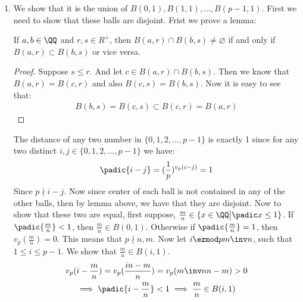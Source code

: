 \begin{enumerate}[label=\ilabel]
        \begin{gather*}
            x = p^r w = p^k p^{r - k} w
        \end{gather*}
        And since $p^{r - k} w \in \ZZ_p$, then $x \in p^k \ZZ_p$. This follows that $I \subseteq p^k \ZZ_p$. Hence $I = p^k \ZZ_p$. And we know that $p^k \ZZ_p$ is describing $B(0, (\frac{1}{p})^k) = \{ x \in \ZZ_p \big| \padic x < (\frac{1}{p})^k \}$. Hence the proof is complete.
    \item
        We show that it is the union of $B(0, 1), B(1, 1), \dots, B(p - 1, 1)$. First we need to show that these balls are disjoint. Frist we prove a lemma:
        \begin{lemma}
            If $a, b \in \QQ$ and $r, s \in R^+$, then $B(a, r) \cap B(b, s) \ne \varnothing$ if and only if $B(a, r) \subset B(b, s)$ or vice versa.
        \end{lemma}
        \begin{proof}
            Suppose $s \le r$. And let $c \in B(a, r) \cap B(b, s)$. Then we know that $B(a, r) = B(c, r)$ and also $B(c, s) = B(b, s)$. Now it is easy to see that:
            \begin{gather*}
                B(b, s) = B(c, s) \subset B(c, r) = B(a, r)
            \end{gather*}
        \end{proof}
        The distance of any two number in $\{0, 1, 2, \dots, p - 1\}$ is exactly 1 since for any two distinct $i, j \in \{0, 1, 2, \dots, p - 1 \}$ we have:
        \begin{gather*}
            \padic{i - j} = (\frac{1}{p})^{v_p(i - j)} = 1
        \end{gather*}
        Since $p \nmid i - j$. Now since center of each ball is not contained in any of the other balls, then by lemma above, we have that they are disjoint. Now to show that these two are equal, first suppose, $\frac{m}{n} \in \{ x \in \QQ \big| \padic x \le 1 \}$.
        If $\padic{\frac{m}{n}} < 1$, then $\frac{m}{n} \in B(0, 1)$. Otherwise if $\padic{\frac{m}{n}} = 1$, then $v_p(\frac{m}{n}) = 0$. This means that $p \nmid n, m$. Now let $i \ezmod p m \inv n$, such that $1 \le i \le p - 1$. We show that $\frac{m}{n} \in B(i, 1)$. 
        \begin{gather*}
            v_p(i - \frac{m}{n}) = v_p(\frac{in - m}{n}) = v_p(m \inv n n - m) > 0 \\
            \implies \padic{i - \frac{m}{n}} < 1 \implies \frac{m}{n} \in B(i, 1)
        \end{gather*}

\end{enumerate}
